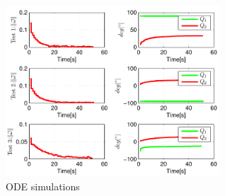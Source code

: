 \begin{figure}
	\centering
	\includegraphics[width=80mm]{./pictures/ODE_graph.pdf}
	\caption{ODE simulations}
	\label{fig:ODE graph}
\end{figure}
